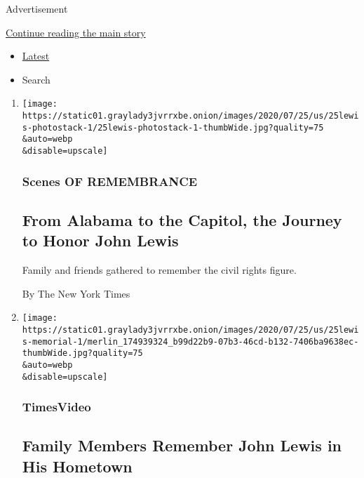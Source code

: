 Advertisement

\protect\hyperlink{after-mid1}{Continue reading the main story}

\begin{itemize}
\tightlist
\item
  \protect\hyperlink{stream-panel}{Latest}
\item
  Search
\end{itemize}

\begin{enumerate}
\def\labelenumi{\arabic{enumi}.}
\item
  \href{/2020/07/25/us/photos-john-lewis-memorial.html}{}

  \texttt{[image: https://static01.graylady3jvrrxbe.onion/images/2020/07/25/us/25lewis-photostack-1/25lewis-photostack-1-thumbWide.jpg?quality=75\\\&auto=webp\\\&disable=upscale]}

  \hypertarget{scenes-of-remembrance}{%
  \subsubsection{Scenes OF REMEMBRANCE}\label{scenes-of-remembrance}}

  \hypertarget{from-alabama-to-the-capitol-the-journey-to-honor-john-lewis}{%
  \subsection{From Alabama to the Capitol, the Journey to Honor John
  Lewis}\label{from-alabama-to-the-capitol-the-journey-to-honor-john-lewis}}

  Family and friends gathered to remember the civil rights figure.

  By The New York Times
\item
  \href{/video/us/politics/100000007256826/john-lewis-memorial-troy-alabama.html}{}

  \texttt{[image: https://static01.graylady3jvrrxbe.onion/images/2020/07/25/us/25lewis-memorial-1/merlin\_174939324\_b99d22b9-07b3-46cd-b132-7406ba9638ec-thumbWide.jpg?quality=75\\\&auto=webp\\\&disable=upscale]}

  \hypertarget{timesvideo}{%
  \subsubsection{TimesVideo}\label{timesvideo}}

  \hypertarget{family-members-remember-john-lewis-in-his-hometown}{%
  \subsection{Family Members Remember John Lewis in His
  Hometown}\label{family-members-remember-john-lewis-in-his-hometown}}


\end{enumerate}
